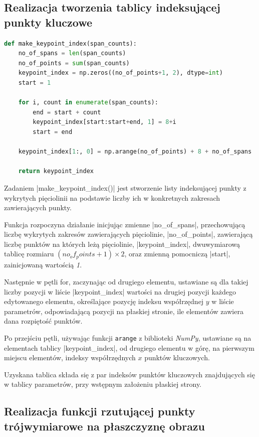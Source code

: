 \subsection{Realizacja tworzenia tablicy indeksującej punkty kluczowe}
\begin{lstlisting}[caption={\pyth|make_keypoint_index()| - funkcja tworząca indeksy punktów kluczowych.}, label={make-keypoint-index}, language=Python]
def make_keypoint_index(span_counts):	
	no_of_spans = len(span_counts)
	no_of_points = sum(span_counts)
	keypoint_index = np.zeros((no_of_points+1, 2), dtype=int)
	start = 1
	
	for i, count in enumerate(span_counts):
		end = start + count
		keypoint_index[start:start+end, 1] = 8+i
		start = end
	
	keypoint_index[1:, 0] = np.arange(no_of_points) + 8 + no_of_spans
	
	return keypoint_index
\end{lstlisting}

Zadaniem \pyth|make_keypoint_index()| jest stworzenie listy indeksującej punkty z wykrytych pięciolinii na podstawie liczby ich w konkretnych zakresach zawierających punkty.

Funkcja rozpoczyna działanie inicjując zmienne \pyth|no_of_spans|, przechowującą liczbę wykrytych zakresów zawierających pięciolinie, \pyth|no_of_points|, zawierającą liczbę punktów na których leżą pięciolinie, \pyth|keypoint_index|, dwuwymiarową tablicę rozmiaru $(no_of_points + 1) \times 2$, oraz zmienną pomocniczą \pyth|start|, zainicjowaną wartością \textit{1}.

Następnie w pętli for, zaczynając od drugiego elementu, ustawiane są dla takiej liczby pozycji w liście \pyth|keypoint_index| wartości na drugiej pozycji każdego edytowanego elementu, określające pozycję indeksu współrzędnej $y$ w liście parametrów, odpowiadającą pozycji na płaskiej stronie, ile elementów zawiera dana rozpiętość punktów.

Po przejściu pętli, używając funkcji \lstinline|arange| z biblioteki \textit{NumPy}, ustawiane są na elementach tablicy \pyth|keypoint_index|, od drugiego elementu w górę, na pierwszym miejscu elementów, indeksy współrzędnych $x$ punktów kluczowych.

Uzyskana tablica składa się z par indeksów punktów kluczowych znajdujących się w tablicy parametrów, przy wstępnym założeniu płaskiej strony.


\subsection{Realizacja funkcji rzutującej punkty trójwymiarowe na płaszczyznę obrazu}

